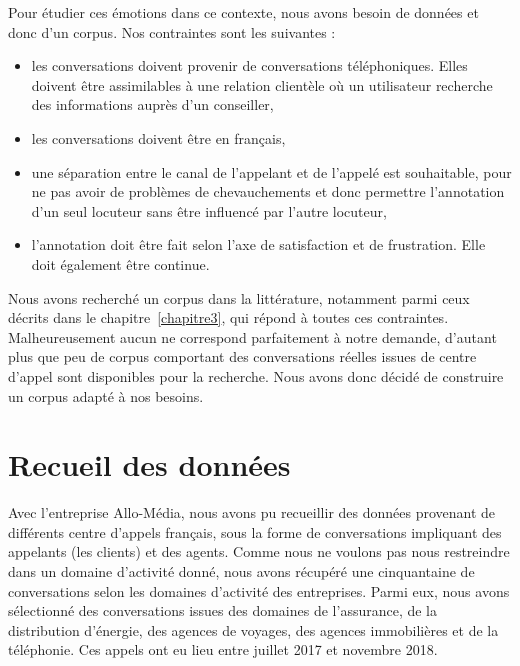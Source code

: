 

Pour étudier ces émotions dans ce contexte, nous avons besoin de données et donc d'un corpus. Nos contraintes sont les suivantes :
\begin{itemize}
  \item les conversations doivent provenir de conversations téléphoniques. Elles doivent être assimilables à une relation clientèle où un utilisateur recherche des informations auprès d'un conseiller,
  \item les conversations doivent être en français,
  \item une séparation entre le canal de l'appelant et de l'appelé est souhaitable, pour ne pas avoir de problèmes de chevauchements et donc permettre l'annotation d'un seul locuteur sans être influencé par l'autre locuteur,
  \item l'annotation doit être fait selon l'axe de satisfaction et de frustration. Elle doit également être continue.
\end{itemize}

Nous avons recherché un corpus dans la littérature, notamment parmi ceux décrits dans le chapitre~\ref{chapitre3}, qui répond à toutes ces contraintes. Malheureusement aucun ne correspond parfaitement à notre demande, d'autant plus que peu de corpus comportant des conversations réelles issues de centre d'appel sont disponibles pour la recherche. Nous avons donc décidé de construire un corpus adapté à nos besoins.

\section{Recueil des données}
Avec l'entreprise Allo-Média, nous avons pu recueillir des données provenant de différents centre d'appels français, sous la forme de conversations impliquant des appelants (les clients) et des agents. Comme nous ne voulons pas nous restreindre dans un domaine d'activité donné, nous avons récupéré une cinquantaine de conversations selon les domaines d'activité des entreprises. Parmi eux, nous avons sélectionné des conversations issues des domaines de l'assurance, de la distribution d'énergie, des agences de voyages, des agences immobilières et de la téléphonie. Ces appels ont eu lieu entre juillet 2017 et novembre 2018.

